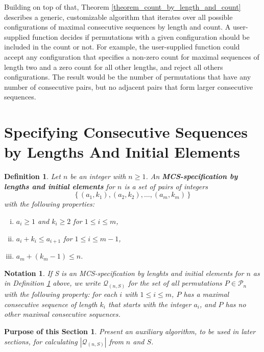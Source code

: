 \documentclass{article}
\newtheorem{definition}[theorem]{Definition}
\newtheorem{notation}[theorem]{Notation}
\newtheorem{purpose}{Purpose of this Section}
\begin{document}
Building on top of that, Theorem \ref{theorem_count_by_length_and_count} describes a generic, customizable algorithm
that iterates over all possible configurations of maximal consecutive sequences by length and count.
A user-supplied function decides if permutations with a given configuration should be included in the count or not.
For example, the user-supplied function could accept any configuration that specifies a non-zero count for maximal
sequences of length two and a zero count for all other lengths, and reject all others configurations.
The result would be the number
of permutations that have any number of consecutive pairs, but no adjacent pairs that form larger
consecutive sequences.

\section{Specifying Consecutive Sequences by Lengths And Initial Elements}

\begin{definition} \label{def_mcs_spec_by_length_and_initial_element}
  Let $n$ be an integer with $n\geq 1$. An {\bf MCS-specification by lengths and initial elements} for $n$ is a
  set of pairs of integers $$\{\,(a_1, k_1), (a_2, k_2), \ldots,(a_m, k_m)\,\}$$ with the following properties:
  \begin{enumerate}[(i)]
  \item
    $a_i \geq 1$ and $k_i \geq 2$ for $1\leq i \leq m$,
  \item
    $a_i + k_i \leq a_{i+1}$ for $1\leq i \leq m-1$,
  \item
    $a_m + (k_m-1) \leq n$.
  \end{enumerate}
\end{definition}

\begin{notation}\label{notation_mcs_spec_by_length_and_initial_element}
  If S is an MCS-specification by lenghts and initial elements for $n$ as in
  Definition \ref{def_mcs_spec_by_length_and_initial_element}
  above, we write ${\mathcal Q}_{(n,S)}$ for the set of all permutations
  $P \in {\mathcal P}_n$ with the following property: for each $i$ with $1\leq i \leq m$, $P$ has a maximal
  consecutive sequence of length $k_i$ that starts with the integer $a_i$, and $P$ has no other maximal
  consecutive sequences.
\end{notation}

\begin{purpose}
Present an auxiliary algorithm, to be used in later sections,
for calculating $|{\mathcal Q}_{(n,S)}|$ from $n$ and $S$.
\end{purpose}
\end{document}
